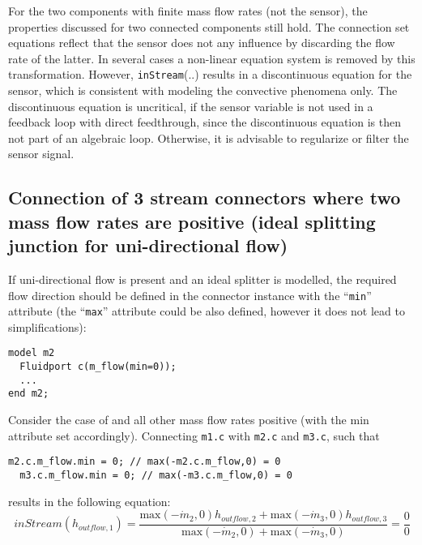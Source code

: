 For the two components with finite mass flow rates (not the sensor), the
properties discussed for two connected components still hold. The
connection set equations reflect that the sensor does not any influence
by discarding the flow rate of the latter. In several cases a non-linear
equation system is removed by this transformation. However, \lstinline!inStream!(..)
results in a discontinuous equation for the sensor, which is consistent
with modeling the convective phenomena only. The discontinuous equation
is uncritical, if the sensor variable is not used in a feedback loop
with direct feedthrough, since the discontinuous equation is then not
part of an algebraic loop. Otherwise, it is advisable to regularize or
filter the sensor signal.

\subsection{Connection of 3 stream connectors where two mass flow rates are positive (ideal splitting junction for uni-directional flow)}

If uni-directional flow is present and an ideal splitter is modelled,
the required flow direction should be defined in the connector instance
with the ``\lstinline!min!'' attribute (the ``\lstinline!max!'' attribute could be also defined,
however it does not lead to simplifications):

\begin{lstlisting}[language=modelica]
model m2
  Fluidport c(m_flow(min=0));
  ...
end m2;
\end{lstlisting}

Consider the case of and all other mass flow rates positive (with the
min attribute set accordingly). Connecting \lstinline!m1.c! with \lstinline!m2.c! and \lstinline!m3.c!, such
that

\begin{lstlisting}[language=modelica]
  m2.c.m_flow.min = 0; // max(-m2.c.m_flow,0) = 0
  m3.c.m_flow.min = 0; // max(-m3.c.m_flow,0) = 0
\end{lstlisting}
results in the following equation:
\begin{equation*}
inStream(h_{outflow,1})=\frac{\text{max}(-\dot{m}_2,0)h_{outflow,2}+\text{max}(-\dot{m}_3,0)h_{outflow,3}}{\text{max}(-\dot{m}_2,0)+\text{max}(-\dot{m}_3,0)}=\frac{0}{0}
\end{equation*}

